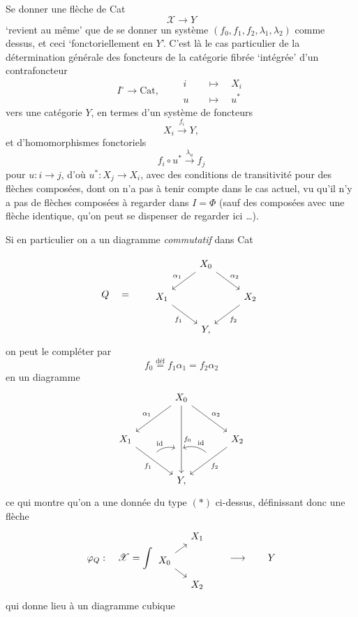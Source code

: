 \documentclass[11pt]{article}
\newcommand{\printedpage}[1]{\marginpar{\footnotesize p.~#1}}
\newcommand{\msp}[1]{\marginpar{\footnotesize [#1]}}
\newcommand{\Cat}{\mathrm{Cat}}
\newcommand{\cX}{\mathcal{X}}
\newcommand{\sX}{\mathscr{X}}
\begin{document}
\msp{page 129}
Se donner une flèche de Cat
\[
\cX \longrightarrow Y
\]
`revient au même' que de se donner un système $(f_0, f_1, f_2, \lambda_1, \lambda_2)$ comme dessus, et ceci `fonctoriellement en $Y$'. C'est là le cas particulier de la détermination générale des foncteurs de la catégorie fibrée `intégrée' d'un contrafoncteur
\[
I^{\circ} \longrightarrow \Cat, \qquad
\begin{aligned}
i &\quad\longmapsto\quad X_i\\
u &\quad\longmapsto\quad u^*
\end{aligned}
\]
vers une catégorie $Y$, en termes d'un système de foncteurs
\[
X_i \xrightarrow{f_i} Y,
\]
et d'homomorphismes fonctoriels
\[
f_i\circ u^* \xrightarrow{\lambda_u} f_j
\]
pour $u : i \longrightarrow j$, d'où $u^* : X_j \longrightarrow X_i$, avec des conditions de transitivité pour des flèches composées, dont on n'a pas à tenir compte dans le cas actuel, vu qu'il n'y a pas de flèches composées à regarder dans $I = \Phi$ (sauf des composées avec une flèche identique, qu'on peut se dispenser de regarder ici \dots).

\msp{page 130}
Si en particulier on a un diagramme \textit{commutatif} dans Cat

\printedpage{88}
\[
Q \quad = \qquad
\begin{tikzcd}
 & X_0 \arrow[dl, "\alpha_1"'] \arrow[dr, "\alpha_2"] & \\
X_1 \arrow[dr, "f_1"'] & & X_2 \arrow[dl, "f_2"] \\
 & Y, &
\end{tikzcd}
\]
on peut le compléter par
\[
f_0 \overset{\text{déf}}{=} f_1\alpha_1 = f_2\alpha_2
\]
en un diagramme
\[
\begin{tikzcd}[row sep=large, column sep=large]
 & X_0 \arrow[dl, "\alpha_1"'] \arrow[dr, "\alpha_2"] \arrow[dd, "f_0", ""'{name=F0, pos=0.65}] & \\
X_1 \arrow[dr, "f_1"', ""{name=F1, pos=0.4}] & & X_2 \arrow[dl, "f_2", ""'{name=F2, pos=0.4}] \\
 & Y, &
\arrow[from=F1, to=F0, bend left, "\mathrm{id}", shorten <=2pt, shorten >=2pt]
\arrow[from=F2, to=F0, bend right, "\mathrm{id}"', shorten <=2pt, shorten >=2pt]
\end{tikzcd}
\]
ce qui montre qu'on a une donnée du type $(*)$ ci-dessus, définissant donc une flèche
\[
\varphi_Q : \quad \sX = \int
\begin{tikzcd}[row sep=small, column sep=small]
 & X_1 \\
X_0 \arrow[ur] \arrow[dr] & \\
 & X_2
\end{tikzcd}
\qquad \longrightarrow \qquad Y
\]
qui donne lieu à un diagramme cubique
\end{document}
